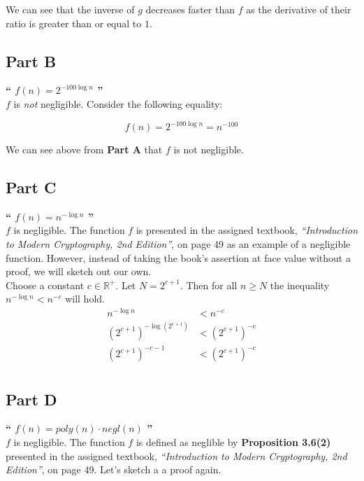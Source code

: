 \documentclass{article}
\newcommand{\HomeworkText}[1]{\textbf{``#1''}\\}
\begin{document}
	We can see that the inverse of $g$ decreases faster than $f$ as the derivative of their ratio is greater than or equal to $1$.

	\subsection*{Part B}
	\HomeworkText{
		$f(n) = 2^{-100 \log n}$
	}

	$f$ is \emph{not} negligible. Consider the following equality:
	
	$$ f(n) = 2^{-100 \log n} = n^{-100}$$
	
	We can see above from \textbf{Part A} that $f$ is not negligible.
	
	\subsection*{Part C}
	\HomeworkText{
		$f(n) = n^{-\log n}$
	}

	$f$ is negligible. The function $f$ is presented in the assigned textbook, \emph{``Introduction to Modern Cryptography, 2nd Edition''}, on page 49 as an example of a negligible function. However, instead of taking the book's assertion at face value without a proof, we will sketch out our own.\\
	
	Choose a constant $c \in \mathbb{R}^{+}$. Let $N = 2^{c+1}$. Then for all $n \ge N$ the inequality $n^{-\log n} < n^{-c}$ will hold.\\
	
	\begin{equation}
	\begin{split}
	  	n^{-\log n} & < n^{-c} \\
	  	(2^{c+1})^{-\log(2^{c+1})} & < (2^{c+1})^{-c} \\
	    (2^{c+1})^{-c - 1} & < (2^{c+1})^{-c} \\
	\end{split}
	\end{equation}


	\subsection*{Part D}
	\HomeworkText{
		$f(n) = poly(n) \cdot negl(n)$
	}

	$f$ is negligible. The function $f$ is defined as neglible by \textbf{Proposition 3.6(2)} presented in the assigned textbook, \emph{``Introduction to Modern Cryptography, 2nd Edition''}, on page 49. Let's sketch a a proof again.\\
	
\end{document}
